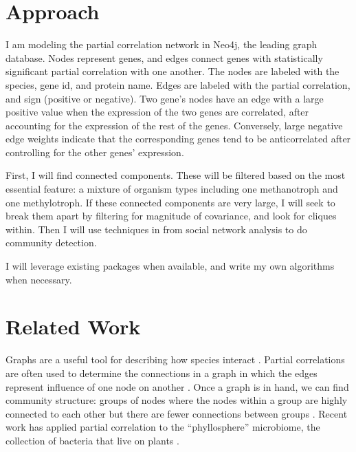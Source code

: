 \documentclass[12pt]{article}
\begin{document}
\section{Approach} %

I am modeling the partial correlation network in Neo4j, the leading graph database.
Nodes represent genes, and edges connect genes with statistically significant partial correlation with one another. 
The nodes are labeled with the species, gene id, and protein name.
Edges are labeled with the partial correlation, and sign (positive or negative). 
Two gene's nodes have an edge with a large positive value when the expression of the two genes are correlated, after accounting for the expression of the rest of the genes. 
Conversely, large negative edge weights indicate that the corresponding genes tend to be anticorrelated after controlling for the other genes' expression. 

First, I will find connected components.  %
These will be filtered based on the most essential feature: a mixture of organism types including one methanotroph and one methylotroph.
If these connected components are very large, I will seek to break them apart by filtering for magnitude of covariance, and look for cliques within. 
Then I will use techniques in from social network analysis to do community detection. 

I will leverage existing packages when available, and write my own algorithms when necessary. 

\section{Related Work}

Graphs are a useful tool for describing how species interact \cite{borthagaray2014inferring}.
Partial correlations are often used to determine the connections in a graph in which the edges represent influence of one node on another \cite{hero2012hub}. 
Once a graph is in hand, we can find community structure: groups of nodes where the nodes within a group are highly connected to each other but there are fewer connections between groups \cite{girvan2002community}.
Recent work has applied partial correlation to the ``phyllosphere'' microbiome, the collection of bacteria that live on plants \cite{agler2016microbial}.
\end{document}
